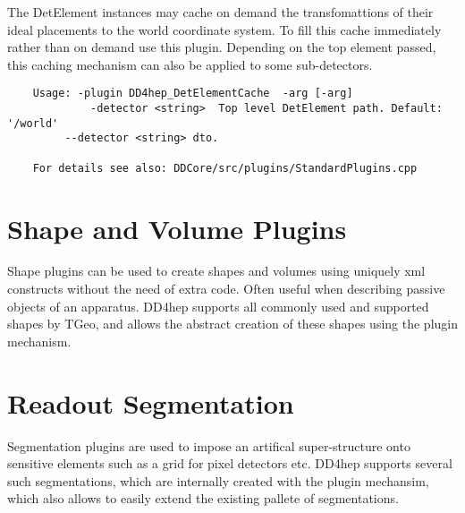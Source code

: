 The DetElement instances may cache on demand the transfomattions of their ideal placements
to the world coordinate system. To fill this cache immediately rather than on demand use this
plugin. Depending on the top element passed, this caching mechanism can also be applied to
some sub-detectors.
\begin{verbatim}
    Usage: -plugin DD4hep_DetElementCache  -arg [-arg]                 
             -detector <string>  Top level DetElement path. Default: '/world'
	     --detector <string> dto.                                        

    For details see also: DDCore/src/plugins/StandardPlugins.cpp
\end{verbatim}



\section{Shape and Volume Plugins}
\label{sec:dd4hep-manual-shape-plugins}

Shape plugins can be used to create shapes and volumes using uniquely xml constructs without the
need of extra code. Often useful when describing passive objects of an apparatus.
DD4hep supports all commonly used and supported shapes by TGeo, and allows the abstract creation 
of these shapes using the plugin mechanism.

\section{Readout Segmentation}
\label{sec:dd4hep-manual-segmentation-plugins}

Segmentation plugins are used to impose an artifical super-structure onto sensitive elements
such as a grid for pixel detectors etc. DD4hep supports several such segmentations, which 
are internally created with the plugin mechansim, which also allows to easily extend 
the existing pallete of segmentations.

